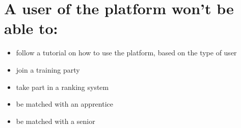 \section*{A user of the platform won't be able to:}
\begin{itemize}[nosep]
    \item follow a tutorial on how to use the platform, based on the type of user
    \item join a training party
    \item take part in a ranking system
    \item be matched with an apprentice
    \item be matched with a senior
\end{itemize}